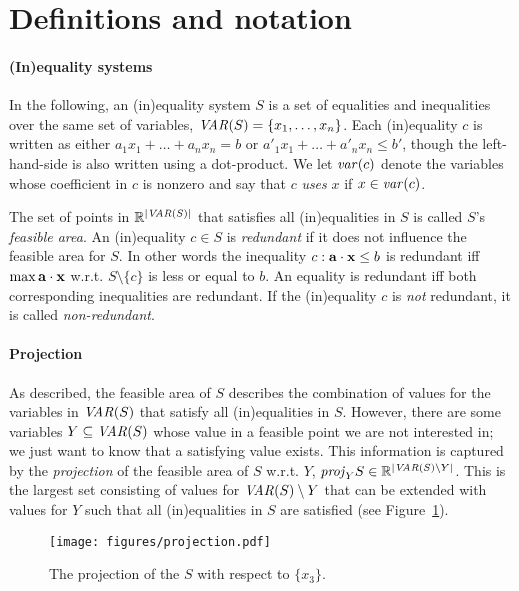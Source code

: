 %
%
\section{Definitions and notation}
\paragraph{(In)equality systems}
In the following, an (in)equality system $S$ is a set of equalities and inequalities over the same set of variables, $\mathit{VAR}(S)=\{x_1,\ldots, x_n\}$. 
Each (in)equality $c$ is written as either $a_1x_1 + \ldots +a_nx_n = b$ or $a'_1x_1 + \ldots +a'_nx_n\leq b'$, though the left-hand-side is also written using a dot-product. 
%
We let $\mathit{var}(c)$ denote the variables whose coefficient in $c$ is nonzero and say that $c$ \emph{uses} $x$ if $x\in \mathit{var}(c)$.

The set of points in $\mathbb{R}^{|\mathit{VAR}(S)|}$ that satisfies all (in)equalities in $S$ is called $S$'s \emph{feasible area}.
%
An (in)equality $c\in S$ is \emph{redundant} if it does not influence the feasible area for $S$. In other words the inequality $c: \mathbf{a}\cdot\mathbf{x}\leq b$ is redundant iff $\max \mathbf{a}\cdot\mathbf{x}$ w.r.t. $S\setminus\{c\}$ is less or equal to $b$.
An equality is redundant iff both corresponding inequalities are redundant.
If the (in)equality $c$ is \emph{not} redundant, it is called \emph{non-redundant}.

\paragraph{Projection}
As described, the feasible area of $S$ describes the combination of values for the variables in $\mathit{VAR}(S)$ that satisfy all (in)equalities in $S$. However, there are some variables $Y\subseteq \mathit{VAR}(S)$ whose value in a feasible point we are not interested in; we just want to know that a satisfying value exists. This information is captured by the \emph{projection} of the feasible area of $S$ w.r.t. $Y$, $\mathit{proj}_YS\in\mathbb{R}^{|\mathit{VAR}(S)\setminus Y|}$. This is the largest set consisting of values for $\mathit{VAR}(S)\setminus Y$ that can be extended with values for $Y$ such that all (in)equalities in $S$ are satisfied (see Figure~\ref{fig:proj}). 

\begin{figure}
	\centering
		\texttt{[image: figures/projection.pdf]}
	\caption{The projection of the $S$ with respect to $\{x_3\}$.}
	\label{fig:proj}
\end{figure}

